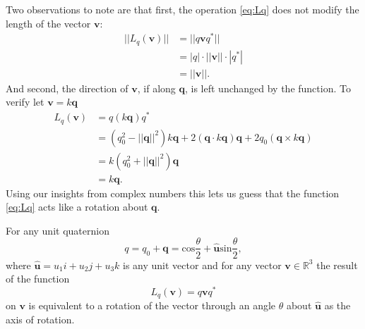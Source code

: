 Two observations to note are that first, the operation \eqref{eq:Lq} does not modify the length of the vector $\textbf{v}$:
\begin{align*}
||L_q(\textbf{v})|| &= ||q\textbf{v}q^*||  \\
&= |q| \cdot ||\textbf{v}|| \cdot |q^*| \\
&= ||\textbf{v}||. 
\end{align*}
And second, the direction of $\textbf{v}$, if along $\textbf{q}$, is left unchanged by the function. To verify let $\textbf{v} = k\textbf{q}$
\begin{align*}
L_q(\textbf{v}) &= q(k\textbf{q})q^*  \\
&= (q_0^2 - ||\textbf{q}||^2)k\textbf{q} + 2(\textbf{q}\cdot k\textbf{q})\textbf{q} + 2q_0(\textbf{q} \times k\textbf{q}) \\
&= k(q_0^2 + ||\textbf{q}||^2)\textbf{q} \\
&= k\textbf{q}.
\end{align*}
Using our insights from complex numbers this lets us guess that the function \eqref{eq:Lq} acts like a rotation about $\textbf{q}$.

\begin{theorem}
For any unit quaternion
\begin{equation}
q = q_0 + \textbf{q} = \mbox{cos}\frac{\theta}{2} + \mathbf{\hat{u}}\mbox{sin}\frac{\theta}{2},
\label{eq:unitquat}
\end{equation}
where $\mathbf{\hat{u}} = u_1i+u_2j+u_3k$ is any unit vector and for any vector $\textbf{v} \in \mathbb{R}^3$ the result of the function
\begin{equation*}
L_q(\textbf{v}) = q\textbf{v}q^*
\end{equation*}
on $\textbf{v}$ is equivalent to a rotation of the vector through an angle $\theta$ about $\mathbf{\hat{u}}$ as the axis of rotation.
\end{theorem}

